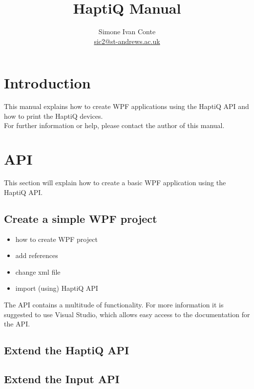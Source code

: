 \documentclass[a4paper]{article}
\title{HaptiQ Manual}
\author{Simone Ivan Conte \\\href{mailto:sic2@st-andrews.ac.uk}{sic2@st-andrews.ac.uk}}
\begin{document}
\maketitle

\newpage

\tableofcontents
\newpage

\section{Introduction}

This manual explains how to create WPF applications using the HaptiQ API and how to print the HaptiQ devices. \\
For further information or help, please contact the author of this manual.

\section{API}

This section will explain how to create a basic WPF application using the HaptiQ API. 

\subsection{Create a simple WPF project}

\begin{itemize}
	\item how to create WPF project
    \item add references
    \item change xml file
    \item import (using) HaptiQ API
\end{itemize}


The API contains a multitude of functionality. For more information it is suggested to use Visual Studio, which allows easy access to the documentation for the API. 

\subsection{Extend the HaptiQ API}

\subsection{Extend the Input API}

\end{document}
